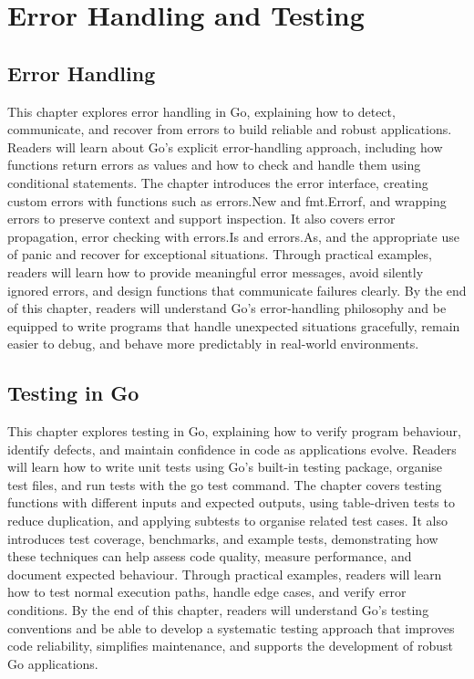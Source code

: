 \documentclass[12pt,oneside]{book}
\begin{document}
\part{Error Handling and Testing}

\chapter{Error Handling}
\begin{chaptersummary}
This chapter explores error handling in Go, explaining how to detect, communicate, and recover from errors to build reliable and robust applications. Readers will learn about Go’s explicit error-handling approach, including how functions return errors as values and how to check and handle them using conditional statements. The chapter introduces the error interface, creating custom errors with functions such as errors.New and fmt.Errorf, and wrapping errors to preserve context and support inspection. It also covers error propagation, error checking with errors.Is and errors.As, and the appropriate use of panic and recover for exceptional situations. Through practical examples, readers will learn how to provide meaningful error messages, avoid silently ignored errors, and design functions that communicate failures clearly. By the end of this chapter, readers will understand Go’s error-handling philosophy and be equipped to write programs that handle unexpected situations gracefully, remain easier to debug, and behave more predictably in real-world environments.
\end{chaptersummary}


\chapter{Testing in Go}
\begin{chaptersummary}
This chapter explores testing in Go, explaining how to verify program behaviour, identify defects, and maintain confidence in code as applications evolve. Readers will learn how to write unit tests using Go’s built-in testing package, organise test files, and run tests with the go test command. The chapter covers testing functions with different inputs and expected outputs, using table-driven tests to reduce duplication, and applying subtests to organise related test cases. It also introduces test coverage, benchmarks, and example tests, demonstrating how these techniques can help assess code quality, measure performance, and document expected behaviour. Through practical examples, readers will learn how to test normal execution paths, handle edge cases, and verify error conditions. By the end of this chapter, readers will understand Go’s testing conventions and be able to develop a systematic testing approach that improves code reliability, simplifies maintenance, and supports the development of robust Go applications.
\end{chaptersummary}

\end{document}
